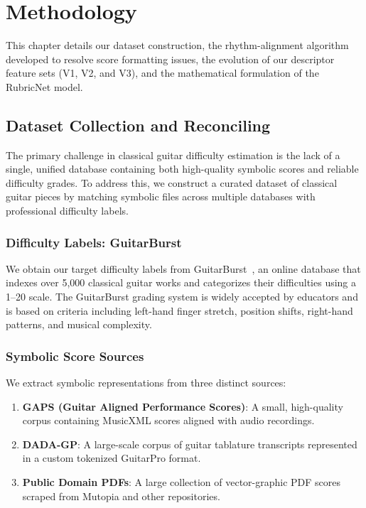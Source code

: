 \chapter{Methodology}
\label{ch:methodology}

This chapter details our dataset construction, the rhythm-alignment algorithm developed to resolve score formatting issues, the evolution of our descriptor feature sets (V1, V2, and V3), and the mathematical formulation of the RubricNet model.

\section{Dataset Collection and Reconciling}
The primary challenge in classical guitar difficulty estimation is the lack of a single, unified database containing both high-quality symbolic scores and reliable difficulty grades. To address this, we construct a curated dataset of classical guitar pieces by matching symbolic files across multiple databases with professional difficulty labels.

\subsection{Difficulty Labels: GuitarBurst}
We obtain our target difficulty labels from GuitarBurst~\cite{guitarburst}, an online database that indexes over 5,000 classical guitar works and categorizes their difficulties using a 1–20 scale. The GuitarBurst grading system is widely accepted by educators and is based on criteria including left-hand finger stretch, position shifts, right-hand patterns, and musical complexity. 

\subsection{Symbolic Score Sources}
We extract symbolic representations from three distinct sources:
\begin{enumerate}
    \item \textbf{GAPS (Guitar Aligned Performance Scores)}: A small, high-quality corpus containing MusicXML scores aligned with audio recordings.
    \item \textbf{DADA-GP}: A large-scale corpus of guitar tablature transcripts represented in a custom tokenized GuitarPro format.
    \item \textbf{Public Domain PDFs}: A large collection of vector-graphic PDF scores scraped from Mutopia and other repositories.
\end{enumerate}

